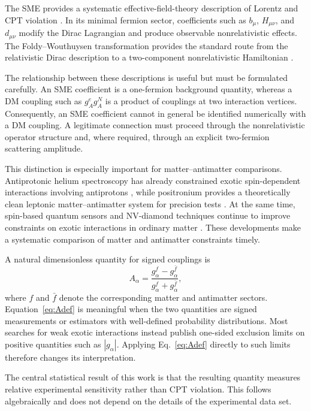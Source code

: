 \documentclass[aps,prd,reprint,superscriptaddress,nofootinbib]{revtex4-2}
\begin{document}
	The SME provides a systematic effective-field-theory description of
	Lorentz and CPT violation \cite{ColladayKostelecky1997,
		ColladayKostelecky1998}. In its minimal fermion sector, coefficients
	such as $b_\mu$, $H_{\mu\nu}$, and $d_{\mu\nu}$ modify the Dirac
	Lagrangian and produce observable nonrelativistic effects. The
	Foldy--Wouthuysen transformation provides the standard route from the
	relativistic Dirac description to a two-component nonrelativistic
	Hamiltonian \cite{FoldyWouthuysen1950,KosteleckyLane1999}.
	
	The relationship between these descriptions is useful but must be
	formulated carefully. An SME coefficient is a one-fermion background
	quantity, whereas a DM coupling such as $g_A^e g_A^N$ is a product of
	couplings at two interaction vertices. Consequently, an SME coefficient
	cannot in general be identified numerically with a DM coupling.
	A legitimate connection must proceed through the nonrelativistic
	operator structure and, where required, through an explicit
	two-fermion scattering amplitude.
	
	This distinction is especially important for matter--antimatter
	comparisons. Antiprotonic helium spectroscopy has already constrained
	exotic spin-dependent interactions involving antiprotons
	\cite{Ficek2018}, while positronium provides a theoretically clean
	leptonic matter--antimatter system for precision tests
	\cite{Adkins2022}. At the same time, spin-based quantum sensors and
	NV-diamond techniques continue to improve constraints on exotic
	interactions in ordinary matter \cite{Jiao2021,Liang2023,Jiang2025}.
	These developments make a systematic comparison of matter and
	antimatter constraints timely.
	
	A natural dimensionless quantity for signed couplings is
	\begin{equation}
		A_\alpha =
		\frac{g_\alpha^f-g_\alpha^{\bar f}}
		{g_\alpha^f+g_\alpha^{\bar f}},
		\label{eq:Adef}
	\end{equation}
	where $f$ and $\bar f$ denote the corresponding matter and antimatter
	sectors. Equation~\eqref{eq:Adef} is meaningful when the two quantities
	are signed measurements or estimators with well-defined probability
	distributions. Most searches for weak exotic interactions instead
	publish one-sided exclusion limits on positive quantities such as
	$|g_\alpha|$. Applying Eq.~\eqref{eq:Adef} directly to such limits
	therefore changes its interpretation.
	
	The central statistical result of this work is that the resulting
	quantity measures relative experimental sensitivity rather than
	CPT violation. This follows algebraically and does not depend on the
	details of the experimental data set.
	
\end{document}
